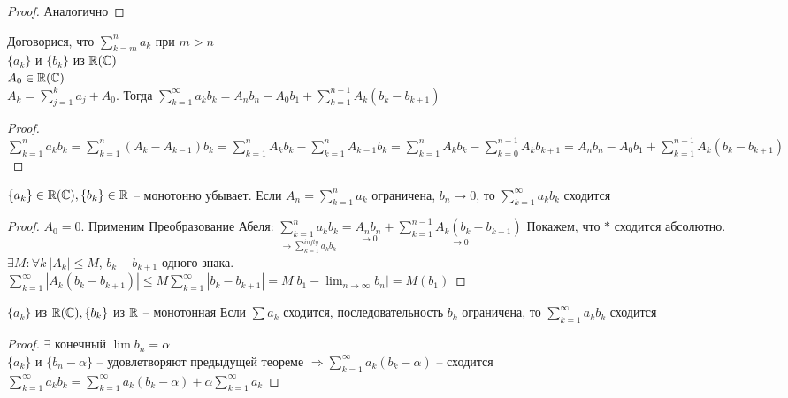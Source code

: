 \begin{proof}
	Аналогично
\end{proof}

\begin{Lm}
	Договорися, что $\sum_{k=m}^{n} a_k$ при $m > n$\\
	$\{a_k\}$ и $\{b_k\}$ из $\mathbb{R} (\mathbb{C})$\\
	$A_0 \in \mathbb{R} (\mathbb{C})$\\
	$A_k = \sum_{j=1}^{k} a_j + A_0$. Тогда
	$\sum_{k=1}^{\infty} a_k b_k = A_n b_n - A_0 b_1 + \sum_{k=1}^{n-1} A_k (b_k - b_{k+1})$
\end{Lm}

\begin{proof}
	$\sum_{k=1}^{n} a_kb_k = \sum_{k=1}^{n} (A_k - A_{k-1}) b_k = \sum_{k=1}^{n} A_kb_k - \sum_{k=1}^{n} A_{k-1} b_k =
	\sum_{k=1}^{n} A_k b_k - \sum_{k=0}^{n-1} A_k b_{k+1} = A_n b_n - A_0 b_1 + \sum_{k=1}^{n-1} A_k(b_k - b_{k+1})$
\end{proof}

\begin{Thm} 
	$\{a_k\} \in \mathbb{R} (\mathbb{C}), \{b_k\} \in \mathbb{R}$ -- монотонно убывает. 
	Если $A_n = \sum_{k=1}^{n} a_k$ ограничена, $b_n \to 0$, то $\sum_{k=1}^{\infty} a_kb_k$ сходится 
\end{Thm} 

\begin{proof}
	$A_0 = 0$. Применим Преобразование Абеля: $\underset{\to \sum_{k=1}^{infty} a_kb_k}{\sum_{k=1}^{n} a_kb_k} = \underset{\to 0}{A_nb_n}   + \underset{\to 0}{\sum_{k=1}^{n-1} A_k(b_k - b_{k+1})}$
	Покажем, что $*$ сходится абсолютно.\\
	$\exists M: \forall k \ |A_k| \leqslant M$, $b_k - b_{k+1}$ одного знака.\\
	$\sum_{k=1}^{\infty} |A_k(b_k - b_{k+1})| \leqslant M \sum_{k=1}^{\infty} |b_k - b_{k+1}| = 
	M |b_1 - \lim_{n \to \infty} b_n| = M(b_1)$
\end{proof}

\begin{Thm} 
	$\{a_k\}$ из $\mathbb{R} (\mathbb{C}), \{b_k\}$ из $\mathbb{R}$ -- монотонная
	Если $\sum a_k$ сходится, последовательность $b_k$ ограничена, то $\sum_{k=1}^{\infty} a_k b_k$ сходится
\end{Thm} 

\begin{proof}
	$\exists$ конечный $\lim b_n = \alpha$\\
	$\{a_k\}$ и $\{b_n - \alpha\}$ -- удовлетворяют предыдущей теореме $\Rightarrow
	\sum_{k=1}^{\infty} a_k (b_k - \alpha)$ -- сходится\\
	$\sum_{k=1}^{\infty} a_k b_k = \sum_{k=1}^{\infty} a_k (b_k - \alpha) + \alpha \sum_{k=1}^{\infty} a_k$
\end{proof}

